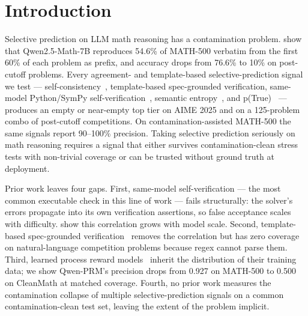 \documentclass{article}
\renewcommand{\headrulewidth}{0pt}%
\begin{document}
\printAffiliationsAndNotice{}
\thispagestyle{icml}
\pagestyle{icml}
\fancyhf{}
\renewcommand{\headrulewidth}{0pt}

\section{Introduction}

Selective prediction on LLM math reasoning has a contamination problem. \citet{wu2025contam} show that Qwen2.5-Math-7B reproduces 54.6\% of MATH-500 verbatim from the first 60\% of each problem as prefix, and accuracy drops from 76.6\% to 10\% on post-cutoff problems. Every agreement- and template-based selective-prediction signal we test --- self-consistency~\citep{wang2023selfconsistency}, template-based spec-grounded verification, same-model Python/SymPy self-verification~\citep{exever}, semantic entropy~\citep{kuhn2023semantic, farquhar2024nature}, and p(True)~\citep{kadavath2022} --- produces an empty or near-empty top tier on AIME 2025 and on a 125-problem combo of post-cutoff competitions. On contamination-assisted MATH-500 the same signals report 90--100\% precision. Taking selective prediction seriously on math reasoning requires a signal that either survives contamination-clean stress tests with non-trivial coverage or can be trusted without ground truth at deployment.

Prior work leaves four gaps. First, same-model self-verification --- the most common executable check in this line of work --- fails structurally: the solver's errors propagate into its own verification assertions, so false acceptance scales with difficulty. \citet{kim2025correlated} show this correlation grows with model scale. Second, template-based spec-grounded verification~\citep{dtv2024} removes the correlation but has zero coverage on natural-language competition problems because regex cannot parse them. Third, learned process reward models~\citep{qwenprm2025, skyworkprm2024} inherit the distribution of their training data; we show Qwen-PRM's precision drops from 0.927 on MATH-500 to 0.500 on CleanMath at matched coverage. Fourth, no prior work measures the contamination collapse of multiple selective-prediction signals on a common contamination-clean test set, leaving the extent of the problem implicit.
\end{document}
